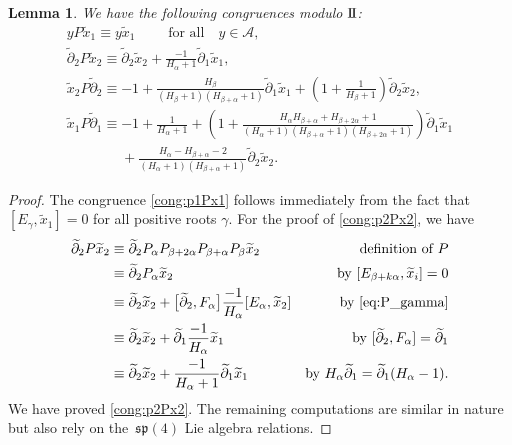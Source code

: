 \documentclass[pdftex]{sigma}
\numberwithin{equation}{section}
\newtheorem{Lemma}[Theorem]{Lemma}
\newcommand{\II}{\mathrm{I\hspace{-.1em}I}}
\begin{document}
\begin{Lemma} \label{lem:aPb-congruences}
	We have the following congruences modulo $\II$:
	\begin{gather}%
		y P\widetilde{x}_{1} \equiv y\widetilde{x}_{1}\qquad \text{ for all}\quad y \in \mathscr{A}\label{cong:p1Px1},\\
		\widetilde{\partial}_2P\widetilde{x}_2 \equiv \widetilde{\partial}_2\widetilde{x}_2+\frac{-1}{H_\alpha+1}\widetilde{\partial}_1\widetilde{x}_1\label{cong:p2Px2},\\
		\widetilde{x}_2P\widetilde{\partial}_2 \equiv -1 + \frac{H_\beta}{(H_\beta+1)(H_{\beta+\alpha}+1)}\widetilde{\partial}_1\widetilde{x}_1+\left(1+\frac{1}{H_\beta+1}\right)\widetilde{\partial}_2\widetilde{x}_2,\nonumber\\
		\widetilde{x}_1P\widetilde{\partial}_1 \equiv -1+\frac{1}{H_\alpha+1}+\left(1+\frac{H_\alpha H_{\beta+\alpha}+H_{\beta+2\alpha}+1}{(H_\alpha+1)(H_{\beta+\alpha}+1)(H_{\beta+2\alpha}+1)}\right)\widetilde{\partial}_1\widetilde{x}_1\nonumber\\
		 \phantom{\widetilde{x}_1P\widetilde{\partial}_1 \equiv }{} + \frac{H_\alpha-H_{\beta+\alpha}-2}{(H_\alpha+1)(H_{\beta+\alpha}+1)}\widetilde{\partial}_2\widetilde{x}_2. \label{cong:x1Pp1}
	\end{gather}
\end{Lemma}

\begin{proof}
	The congruence \eqref{cong:p1Px1} follows immediately from the fact that $[E_\gamma,\widetilde{x}_1]=0$ for all positive roots $\gamma$.
	For the proof of \eqref{cong:p2Px2}, we have
	\begin{align*}
		\widetilde{\partial}_2 P\widetilde{x}_2 &\equiv \widetilde{\partial}_2 P_\alpha P_{\beta+2\alpha} P_{\beta+\alpha} P_\beta \widetilde{x}_2 &\text{definition of $P$}\\
		&\equiv \widetilde{\partial}_2 P_\alpha \widetilde{x}_2 &\text{by $[E_{\beta+k\alpha},\widetilde{x}_i]=0$}\\
		&\equiv \widetilde{\partial}_2\widetilde{x}_2+\bigl[\widetilde{\partial}_2,F_\alpha\bigr]\frac{-1}{H_\alpha}[E_\alpha,\widetilde{x}_2]&\text{by \eqref{eq:P_gamma}}\\
		&\equiv \widetilde{\partial}_2\widetilde{x}_2 + \widetilde{\partial}_1\frac{-1}{H_\alpha}\widetilde{x}_1&\text{by $[\widetilde{\partial}_2,F_\alpha]=\widetilde{\partial}_1$}\\
		&\equiv \widetilde{\partial}_2\widetilde{x}_2+\frac{-1}{H_\alpha+1}\widetilde{\partial}_1\widetilde{x}_1&\text{by $H_\alpha\widetilde{\partial}_1=\widetilde{\partial}_1(H_\alpha-1)$}.
	\end{align*}
	We have proved \eqref{cong:p2Px2}. The remaining computations are similar in nature but also rely on the~$\mathfrak{sp}(4)$ Lie algebra relations.
\end{proof}
\end{document}

